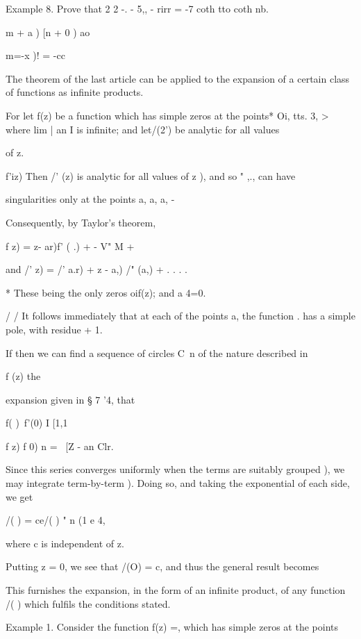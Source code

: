 Example 8. Prove that 2 2 -. - 5,, - rirr = -7 coth tto coth nb.

 m + a ) [n + 0 ) ao

m=-x )! = -cc


The theorem of the last article can be applied to the expansion of a
certain class of functions as infinite products.

For let f(z) be a function which has simple zeros at the points* Oi,
tts. 3, > where lim | an I is infinite; and let/(2') be analytic
for all values

of z.

f'iz) Then /' (z) is analytic for all values of z ), and so "
,., can have

singularities only at the points a, a, a, -

Consequently, by Taylor's theorem,

f z) = z- ar)f' ( .) + - V" M +

and /' z) = /' a.r) + z - a,) /" (a,) + . . . .

* These being the only zeros oif(z); and a 4=0.

/ /
%
%
It follows immediately that at each of the points a, the function .
has a simple pole, with residue + 1.

If then we can find a sequence of circles C\ n of the nature described
in

f (z) %
the

expansion given in § 7 '4, that

f( )\ f'(0) I [1,1

f z) f 0) n = \ [Z - an Clr.

Since this series converges uniformly when the terms are suitably
grouped ), we may integrate term-by-term ). Doing so, and
taking the exponential of each side, we get

/( ) = ce/( ) " n (1 e 4,

where c is independent of z.

Putting z = 0, we see that /(O) = c, and thus the general result
becomes

This furnishes the expansion, in the form of an infinite product, of
any function /( ) which fulfils the conditions stated.

Example 1. Consider the function f(z) =, which has simple zeros at
the points

